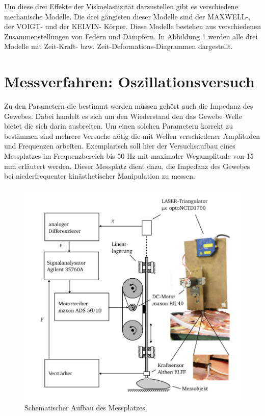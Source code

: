 \documentclass[11pt]{article}
\begin{document}
		Um diese drei Effekte der Viskoelastizität darzustellen gibt es verschiedene mechanische 
		Modelle. Die drei gängisten dieser Modelle sind der MAXWELL-, der VOIGT- und der KELVIN-
		Körper. Diese Modelle bestehen aus verschiedenen Zusammenstellungen von Federn und Dämpfern.
		In Abbildung 1 werden alle drei Modelle mit Zeit-Kraft- bzw. Zeit-Deformations-Diagrammen 
		dargestellt. 
		
		

		 

	\section{Messverfahren: Oszillationsversuch}
		 Zu den Parametern die bestimmt werden müssen gehört auch die Impedanz des Gewebes.
		 Dabei handelt es sich um den Wiederstand den das Gewebe Welle bietet die sich darin 
		 ausbreiten. Um einen solchen Parametern korrekt zu bestimmen sind mehrere Versuche nötig 
		 die mit Wellen verschiedener Amplituden und Frequenzen arbeiten. Exemplarisch soll
		 hier der Versuchsaufbau eines Messplatzes im Frequenzbereich bis 50 Hz mit maximaler 
		 Wegamplitude von 15 mm erläutert werden. Dieser Messplatz dient dazu, die Impedanz des 
		 Gewebes bei niederfrequenter kinästhetischer Manipulation zu messen.
		  
		 \begin{figure}[h!]
		  \centering
			\includegraphics[width=\textwidth]{mess2.png}
			\caption{Schematischer Aufbau des Messplatzes.}
		\end{figure} 
		
\end{document}
